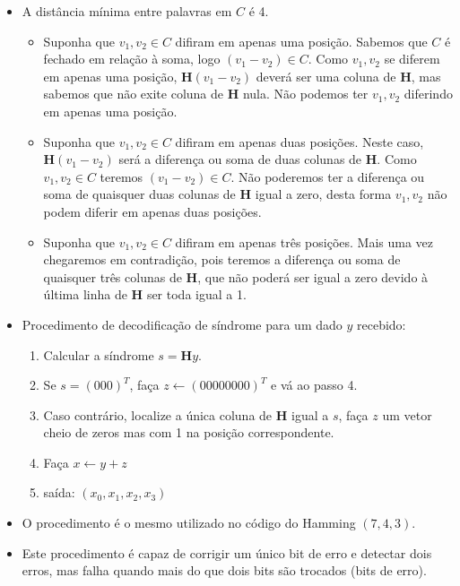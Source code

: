 \begin{frame}[allowframebreaks]
\begin{itemize}
     \item A distância mínima entre palavras em $C$ é 4.
	\begin{itemize} 
	\item Suponha que $v_1, v_2 \in C$ difiram em apenas uma posição. Sabemos que $C$ é fechado
	em relação à soma, logo $(v_1 - v_2) \in C$. Como $v_1, v_2$ se diferem em apenas uma posição, 
	$\mathbf{H} (v_1 - v_2)$ deverá ser uma coluna de $\mathbf{H}$, mas sabemos que não exite coluna
	de $\mathbf{H}$ nula. Não podemos ter $v_1, v_2$ diferindo em apenas uma posição.
	\item Suponha que $v_1, v_2 \in C$ difiram em apenas duas posições. Neste caso, $\mathbf{H} (v_1 - v_2)$
	será a diferença ou soma de duas colunas de $\mathbf{H}$.  Como $v_1, v_2 \in C$
	teremos $(v_1 - v_2) \in C$. Não poderemos ter a diferença ou soma de quaisquer duas colunas de $\mathbf{H}$
	igual a zero, desta forma $v_1,v_2$ não podem diferir em apenas duas posições.
	\item Suponha que $v_1, v_2 \in C$ difiram em apenas três posições. Mais uma vez chegaremos 
	em contradição, pois teremos a diferença ou soma de quaisquer três colunas de $\mathbf{H}$,
	que não poderá ser igual a zero devido à última linha de $\mathbf{H}$ ser toda igual a 1.
	\end{itemize}



  \item Procedimento de decodificação de síndrome para um dado $y$ recebido:
  \begin{enumerate}
  \item Calcular a síndrome $s = \mathbf{H} y$.
  \item Se $s = (000)^T$, faça $z \leftarrow (00000000)^T$ e vá ao passo 4.
  \item Caso contrário, localize a única coluna de $\mathbf{H}$ igual a $s$, faça $z$ um vetor cheio de zeros mas
        com 1 na posição correspondente.
  \item Faça $x \leftarrow y+z$
  \item saída: $(x_0, x_1, x_2, x_3)$
  \end{enumerate}
  \item O procedimento é o mesmo utilizado no código do Hamming $(7,4,3)$.
  \item Este procedimento é capaz de corrigir um único bit de erro e detectar dois erros, 
	mas falha quando mais do que dois bits são trocados (bits de erro).
\end{itemize}

\end{frame}



